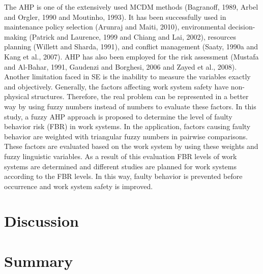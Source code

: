 \documentclass[twocolumn]{article}
\begin{document}
The AHP is one of the extensively used MCDM methods (Bagranoff, 1989, Arbel and Orgler, 1990 and Moutinho, 1993). It has been successfully used in maintenance policy selection (Arunraj and Maiti, 2010), environmental decision-making (Patrick and Laurence, 1999 and Chiang and Lai, 2002), resources planning (Willett and Sharda, 1991), and conflict management (Saaty, 1990a and Kang et al., 2007). AHP has also been employed for the risk assessment (Mustafa and Al-Bahar, 1991, Gaudenzi and Borghesi, 2006 and Zayed et al., 2008).
Another limitation faced in SE is the inability to measure the variables exactly and objectively. Generally, the factors affecting work system safety have non-physical structures. Therefore, the real problem can be represented in a better way by using fuzzy numbers instead of numbers to evaluate these factors. In this study, a fuzzy AHP approach is proposed to determine the level of faulty behavior risk (FBR) in work systems. In the application, factors causing faulty behavior are weighted with triangular fuzzy numbers in pairwise comparisons. These factors are evaluated based on the work system by using these weights and fuzzy linguistic variables. As a result of this evaluation FBR levels of work systems are determined and different studies are planned for work systems according to the FBR levels. In this way, faulty behavior is prevented before occurrence and work system safety is improved.

\section{Discussion}
\section{Summary}

\cite{*}


\end{document}
